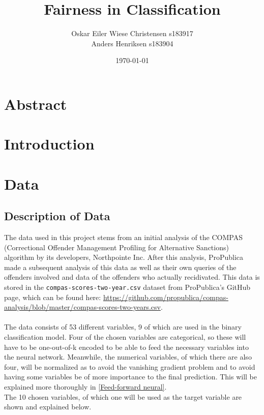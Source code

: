 \documentclass[11pt, fleqn, titlepage]{article}
\title{Fairness in Classification}
\author{Oskar Eiler Wiese Christensen s183917 \\ Anders Henriksen s183904}
\date{\today}
\begin{document}
	
	\maketitle
	\tableofcontents \newpage
	\section{Abstract}
	
	
	\section{Introduction}
	
	
	
	\section{Data}
	
		\subsection{Description of Data}
		The data used in this project stems from an initial analysis of the COMPAS (Correctional Offender Management Profiling for Alternative Sanctions) algorithm by its developers, Northpointe Inc. After this analysis, ProPublica made a subsequent analysis of this data as well as their own queries of the offenders involved and data of the offenders who actually recidivated. This data is stored in the \texttt{compas-scores-two-year.csv} dataset from ProPublica's GitHub page, which can be found here: \url{https://github.com/propublica/compas-analysis/blob/master/compas-scores-two-years.csv}. \\\\
		\noindent The data consists of 53 different variables, 9 of which are used in the binary classification model. Four of the chosen variables are categorical, so these will have to be one-out-of-k encoded to be able to feed the necessary variables into the neural network. Meanwhile, the numerical variables, of which there are also four, will be normalized as to avoid the vanishing gradient problem and to avoid having some variables be of more importance to the final prediction. This will be explained more thoroughly in \ref{Feed-forward neural}. \\
		The 10 chosen variables, of which one will be used as the target variable are shown and explained below.
		
\end{document}
